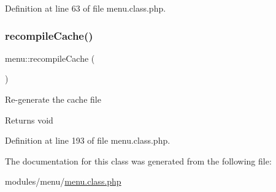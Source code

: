 Definition at line 63 of file menu.\+class.\+php.

\mbox{\label{classmenu_a583aef0b15f6391d8e591f3498755f2e}} 
\subsubsection{\texorpdfstring{recompile\+Cache()}{recompileCache()}}
{\footnotesize\ttfamily menu\+::recompile\+Cache (\begin{DoxyParamCaption}{ }\end{DoxyParamCaption})}

Re-\/generate the cache file \begin{DoxyReturn}{Returns}
void 
\end{DoxyReturn}


Definition at line 193 of file menu.\+class.\+php.



The documentation for this class was generated from the following file\+:\begin{DoxyCompactItemize}
\item 
modules/menu/\hyperlink{menu_8class_8php}{menu.\+class.\+php}\end{DoxyCompactItemize}
